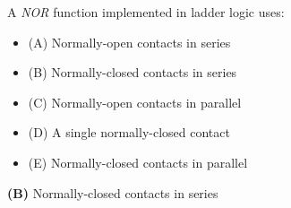

A {\it NOR} function implemented in ladder logic uses:

\begin{itemize}
\item{(A)} Normally-open contacts in series
\vskip 5pt 
\item{(B)} Normally-closed contacts in series
\vskip 5pt 
\item{(C)} Normally-open contacts in parallel
\vskip 5pt 
\item{(D)} A single normally-closed contact
\vskip 5pt 
\item{(E)} Normally-closed contacts in parallel
\end{itemize}







{\bf (B)} Normally-closed contacts in series
 










